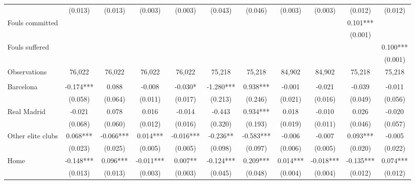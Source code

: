 \begin{table}[!h]
{\begin{threeparttable}
\begin{tabular}[t]{lcccccccccc}
\hspace{1em} & (0.013) & (0.013) & (0.003) & (0.003) & (0.043) & (0.046) & (0.003) & (0.003) & (0.012) & (0.012)\\
\hspace{1em}Fouls committed &  &  &  &  &  &  &  &  & 0.101*** & \\
\hspace{1em} &  &  &  &  &  &  &  &  & (0.001) \vphantom{1} & \\
\hspace{1em}Fouls suffered &  &  &  &  &  &  &  &  &  & 0.100***\\
\hspace{1em} &  &  &  &  &  &  &  &  &  & \vphantom{1} (0.001)\\
\hspace{1em}Observations & 76,022 & 76,022 & 76,022 & 76,022 & 75,218 & 75,218 & 84,902 & 84,902 & 75,218 & 75,218\\
\addlinespace[0.5em]
\multicolumn{11}{l}{\textit{Panel B: Adding in-game style controls (possession bins, shots)}}\\
\midrule \hspace{1em}Barcelona & -0.174*** & 0.088 & -0.008 & -0.030* & -1.280*** & 0.938*** & -0.001 & -0.021 & -0.039 & -0.011\\
\hspace{1em} & (0.058) & (0.064) & (0.011) & (0.017) & (0.213) & (0.246) & (0.021) & (0.016) & (0.049) & (0.056)\\
\hspace{1em}Real Madrid & -0.021 & 0.078 & 0.016 & -0.014 & -0.443 & 0.934*** & 0.018 & -0.010 & 0.026 & -0.020\\
\hspace{1em} & (0.068) & (0.060) & (0.012) & (0.016) & (0.320) & (0.193) & (0.019) & (0.011) & (0.046) & (0.057)\\
\hspace{1em}Other elite clubs & 0.068*** & -0.066*** & 0.014*** & -0.016*** & -0.236** & -0.583*** & -0.006 & -0.007 & 0.093*** & -0.005\\
\hspace{1em} & (0.023) & (0.025) & (0.005) & (0.005) & (0.098) & (0.097) & (0.006) & (0.005) & (0.020) & (0.022)\\
\hspace{1em}Home & -0.148*** & 0.096*** & -0.011*** & 0.007** & -0.124*** & 0.209*** & 0.014*** & -0.018*** & -0.135*** & 0.074***\\
\hspace{1em} & (0.013) & (0.013) & (0.003) & (0.003) & (0.045) & (0.048) & (0.004) & (0.004) & (0.012) & (0.012)\\

\end{tabular}
\end{threeparttable}}
\end{table}
